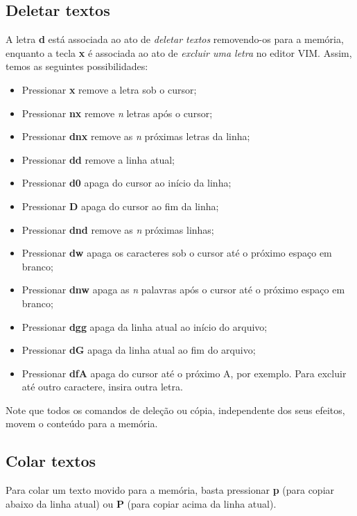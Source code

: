 \documentclass[12pt]{article}
\begin{document}
	\subsection{Deletar textos}
	A letra \textbf{d} está associada ao ato de \emph{deletar textos} removendo-os para a memória, enquanto a tecla \textbf{x}  é associada ao ato de \emph{excluir uma letra} no editor VIM. Assim, temos as seguintes possibilidades:
	\begin{itemize}
		\item Pressionar \textbf{x} remove a letra sob o cursor;
		\item Pressionar \textbf{nx} remove \emph{n} letras após o cursor;
		\item Pressionar \textbf{dnx} remove as \emph{n} próximas letras da linha;
		\item Pressionar \textbf{dd} remove a linha atual;
		\item Pressionar \textbf{d0} apaga do cursor ao início da linha;
		\item Pressionar \textbf{D} apaga do cursor ao fim da linha;
		\item Pressionar \textbf{dnd} remove as \emph{n} próximas linhas;
		\item Pressionar \textbf{dw} apaga os caracteres sob o cursor até o próximo espaço em branco;
		\item Pressionar \textbf{dnw} apaga as \emph{n} palavras após o cursor até o próximo espaço em branco;
		\item Pressionar \textbf{dgg} apaga da linha atual ao início do arquivo;
		\item Pressionar \textbf{dG} apaga da linha atual ao fim do arquivo;
		\item Pressionar \textbf{dfA} apaga do cursor até o próximo A, por exemplo. Para excluir até outro caractere, insira outra letra.
	\end{itemize}
	Note que todos os comandos de deleção ou cópia, independente dos seus efeitos, movem o conteúdo para a memória.
	\subsection{Colar textos}
	Para colar um texto movido para a memória, basta pressionar \textbf{p} (para copiar abaixo da linha atual) ou \textbf{P} (para copiar acima da linha atual).
\end{document}
